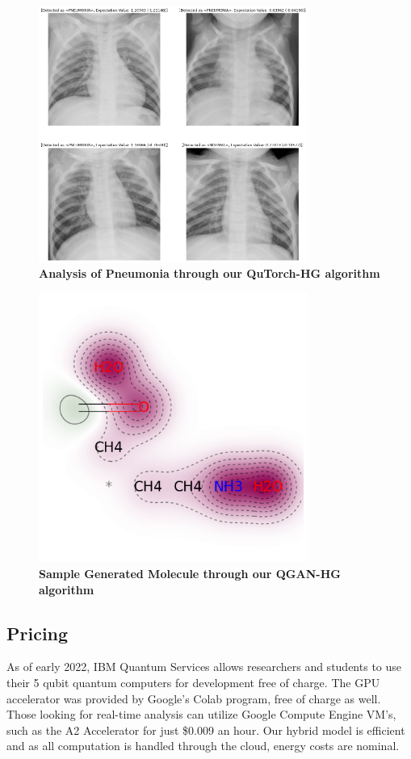 \documentclass{scrartcl}
\begin{document}
\begin{figure}[htbp]
\centering
\includegraphics[width=250pt]{./assets/output3.png}
\caption{\textbf{Analysis of Pneumonia through our QuTorch-HG algorithm}}
\end{figure}

\begin{figure}[htbp]
\centering
\includegraphics[width=250pt]{./assets/output4.png}
\caption{\textbf{Sample Generated Molecule through our QGAN-HG algorithm}}
\end{figure}

\subsection{Pricing}
\label{sec:org4368166}

As of early 2022, IBM Quantum Services allows researchers and students to use their 5 qubit quantum computers for development free of charge. The GPU accelerator was provided by Google's Colab program, free of charge as well. Those looking for real-time analysis can utilize Google Compute Engine VM's, such as the A2 Accelerator for just \$0.009 an hour. Our hybrid model is efficient and as all computation is handled through the cloud, energy costs are nominal.
\end{document}

